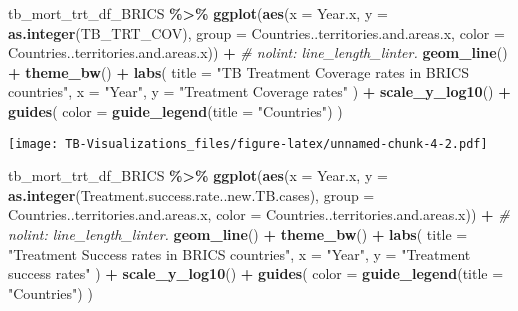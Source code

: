 \documentclass[
]{article}
\newenvironment{Shaded}{\begin{snugshade}}{\end{snugshade}}
\newcommand{\AttributeTok}[1]{\textcolor[rgb]{0.13,0.29,0.53}{#1}}
\newcommand{\CommentTok}[1]{\textcolor[rgb]{0.56,0.35,0.01}{\textit{#1}}}
\newcommand{\FunctionTok}[1]{\textcolor[rgb]{0.13,0.29,0.53}{\textbf{#1}}}
\newcommand{\NormalTok}[1]{#1}
\newcommand{\SpecialCharTok}[1]{\textcolor[rgb]{0.81,0.36,0.00}{\textbf{#1}}}
\newcommand{\StringTok}[1]{\textcolor[rgb]{0.31,0.60,0.02}{#1}}
\begin{document}
\begin{Shaded}
\begin{Highlighting}[]
\NormalTok{tb\_mort\_trt\_df\_BRICS }\SpecialCharTok{\%\textgreater{}\%}
  \FunctionTok{ggplot}\NormalTok{(}\FunctionTok{aes}\NormalTok{(}\AttributeTok{x =}\NormalTok{ Year.x, }\AttributeTok{y =} \FunctionTok{as.integer}\NormalTok{(TB\_TRT\_COV), }\AttributeTok{group =}\NormalTok{ Countries..territories.and.areas.x, }\AttributeTok{color =}\NormalTok{ Countries..territories.and.areas.x)) }\SpecialCharTok{+} \CommentTok{\# nolint: line\_length\_linter.}
  \FunctionTok{geom\_line}\NormalTok{() }\SpecialCharTok{+}
  \FunctionTok{theme\_bw}\NormalTok{() }\SpecialCharTok{+}
  \FunctionTok{labs}\NormalTok{(}
    \AttributeTok{title =} \StringTok{"TB Treatment Coverage rates in BRICS countries"}\NormalTok{,}
    \AttributeTok{x =} \StringTok{"Year"}\NormalTok{,}
    \AttributeTok{y =} \StringTok{"Treatment Coverage rates"}
\NormalTok{  ) }\SpecialCharTok{+}
  \FunctionTok{scale\_y\_log10}\NormalTok{() }\SpecialCharTok{+}
  \FunctionTok{guides}\NormalTok{(}
    \AttributeTok{color =} \FunctionTok{guide\_legend}\NormalTok{(}\AttributeTok{title =} \StringTok{"Countries"}\NormalTok{)}
\NormalTok{  )}
\end{Highlighting}
\end{Shaded}

\texttt{[image: TB-Visualizations\_files/figure-latex/unnamed-chunk-4-2.pdf]}

\begin{Shaded}
\begin{Highlighting}[]
\NormalTok{tb\_mort\_trt\_df\_BRICS }\SpecialCharTok{\%\textgreater{}\%}
  \FunctionTok{ggplot}\NormalTok{(}\FunctionTok{aes}\NormalTok{(}\AttributeTok{x =}\NormalTok{ Year.x, }\AttributeTok{y =} \FunctionTok{as.integer}\NormalTok{(Treatment.success.rate..new.TB.cases), }\AttributeTok{group =}\NormalTok{ Countries..territories.and.areas.x, }\AttributeTok{color =}\NormalTok{ Countries..territories.and.areas.x)) }\SpecialCharTok{+} \CommentTok{\# nolint: line\_length\_linter.}
  \FunctionTok{geom\_line}\NormalTok{() }\SpecialCharTok{+}
  \FunctionTok{theme\_bw}\NormalTok{() }\SpecialCharTok{+}
  \FunctionTok{labs}\NormalTok{(}
    \AttributeTok{title =} \StringTok{"Treatment Success rates in BRICS countries"}\NormalTok{,}
    \AttributeTok{x =} \StringTok{"Year"}\NormalTok{,}
    \AttributeTok{y =} \StringTok{"Treatment success rates"}
\NormalTok{  ) }\SpecialCharTok{+}
  \FunctionTok{scale\_y\_log10}\NormalTok{() }\SpecialCharTok{+}
  \FunctionTok{guides}\NormalTok{(}
    \AttributeTok{color =} \FunctionTok{guide\_legend}\NormalTok{(}\AttributeTok{title =} \StringTok{"Countries"}\NormalTok{)}
\NormalTok{  )}
\end{Highlighting}
\end{Shaded}
\end{document}
